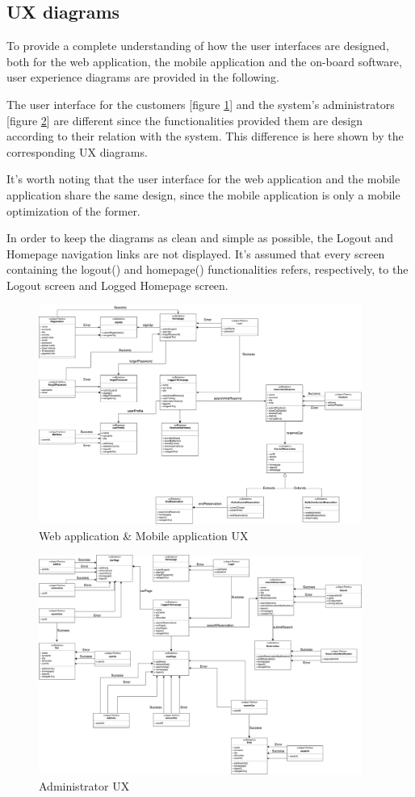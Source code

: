 \subsection{UX diagrams}

To provide a complete understanding of how the user interfaces are designed, both for the web application, the mobile application and the on-board software, user experience diagrams are provided in the following.

The user interface for the customers [figure \ref{fig:device-ux}] and the system's administrators [figure \ref{fig:admin-ux}] are different since the functionalities provided them are design according to their relation with the system. This difference is here shown by the corresponding UX diagrams.

It's worth noting that the user interface for the web application and the mobile application share the same design, since the mobile application is only a mobile optimization of the former.

In order to keep the diagrams as clean and simple as possible, the Logout and Homepage navigation links are not displayed. It's assumed that every screen containing the logout() and homepage() functionalities refers, respectively, to the Logout screen and Logged Homepage screen.

\begin{figure}[H]
	\centerline{
		\includegraphics[width=400px]{../Datas/images/deviceUX.pdf}
	}
	\caption{Web application \& Mobile application UX}
	\label{fig:device-ux}
\end{figure}

\begin{figure}[H]
	\centerline{
		\includegraphics[width=400px]{../Datas/images/UXoperator.pdf}
	}
	\caption{Administrator UX}
	\label{fig:admin-ux}
\end{figure}

